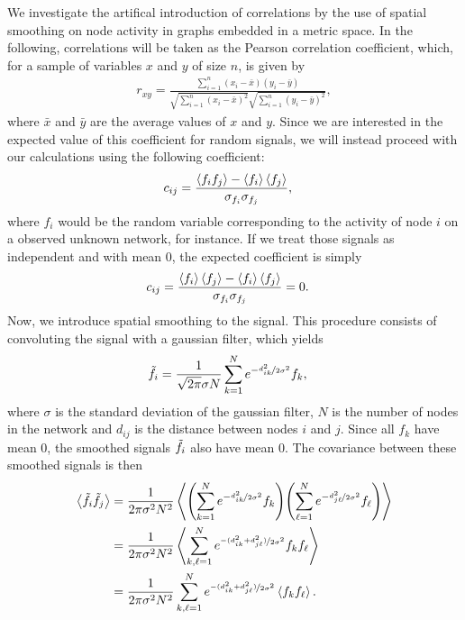\documentclass{article}
\begin{document}
\begin{multicols}{2}
We investigate the artifical introduction of correlations by the use of spatial smoothing on node activity in graphs embedded in a metric space. In the following, correlations will be taken as the Pearson correlation coefficient,  which, for a sample of variables $x$ and $y$ of size $n$, is given by
\begin{align*}
    r_{xy} = \frac{\sum_{i=1}^n(x_i-\bar{x})(y_i-\bar{y})}{\sqrt{\sum ^n _{i=1}(x_i - \bar{x})^2} \sqrt{\sum ^n _{i=1}(y_i - \bar{y})^2}},
\end{align*}
where $\bar{x}$ and $\bar{y}$ are the average values of $x$ and $y$. Since we are interested in the expected value of this coefficient for random signals, we will instead proceed with our calculations using the following coefficient:
\begin{align}
    c_{ij} &= \frac{\expval{f_if_j}-\expval{f_i}\expval{f_j}}{\sigma_{f_i}\sigma_{f_j}},
    \label{eq:exp_coefficient}
\end{align}
where $f_i$ would be the random variable corresponding to the activity of node $i$ on a observed unknown network, for instance. If we treat those signals as independent and with mean $0$, the expected coefficient is simply
\begin{align*}
    c_{ij} &= \frac{\expval{f_i}\expval{f_j}-\expval{f_i}\expval{f_j}}{\sigma_{f_i}\sigma_{f_j}} = 0.
\end{align*}
Now, we introduce spatial smoothing to the signal. This procedure consists of convoluting the signal with a gaussian filter, which yields
\begin{align*}
    \Tilde{f}_i &= \frac{1}{\sqrt{2\pi}\sigma N}\sum_{k=1}^N e^{-\nicefrac{d_{ik}^2}{2\sigma^2}}f_k,
\end{align*}
where $\sigma$ is the standard deviation of the gaussian filter, $N$ is the number of nodes in the network and $d_{ij}$ is the distance between nodes $i$ and $j$. Since all $f_k$ have mean $0$, the smoothed signals $\Tilde{f}_i$ also have mean $0$. The covariance between these smoothed signals is then
\begin{align*}
    \expval{\Tilde{f}_i\Tilde{f}_j} &= \frac{1}{2\pi\sigma^2N^2}\expval{\qty(\sum_{k=1}^N e^{-\nicefrac{d_{ik}^2}{2\sigma^2}}f_k)\qty(\sum_{\ell=1}^N e^{-\nicefrac{d_{j\ell}^2}{2\sigma^2}}f_\ell)}\\
    &= \frac{1}{2\pi\sigma^2N^2}\expval{\sum_{k, \ell =1}^N e^{\nicefrac{-(d_{ik}^2+d_{j\ell}^2)}{2\sigma^2}}f_kf_\ell}\\
    &= \frac{1}{2\pi\sigma^2N^2}\sum_{k, \ell =1}^N e^{\nicefrac{-(d_{ik}^2+d_{j\ell}^2)}{2\sigma^2}}\expval{f_kf_\ell}.

\end{align*}
\end{multicols}
\end{document}
